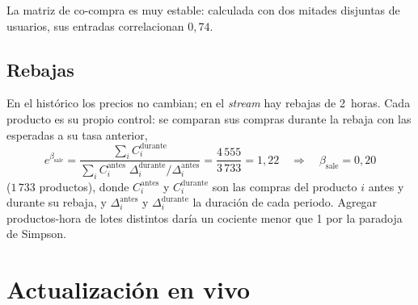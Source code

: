 \documentclass[11pt,a4paper]{article}
\begin{document}
La matriz de co-compra es muy estable: calculada con dos mitades disjuntas de usuarios, sus entradas
correlacionan $0{,}74$.

\subsection{Rebajas}

En el histórico los precios no cambian; en el \emph{stream} hay rebajas de 2~horas. Cada producto es su
propio control: se comparan sus compras durante la rebaja con las esperadas a su tasa anterior,
\[
e^{\beta_{\text{sale}}}=\frac{\sum_i C_i^{\text{durante}}}{\sum_i C_i^{\text{antes}}\;\Delta_i^{\text{durante}}/\Delta_i^{\text{antes}}}
=\frac{4\,555}{3\,733}=1{,}22\quad\Longrightarrow\quad\beta_{\text{sale}}=0{,}20
\]
($1\,733$ productos), donde $C_i^{\text{antes}}$ y $C_i^{\text{durante}}$ son las compras del producto $i$
antes y durante su rebaja, y $\Delta_i^{\text{antes}}$ y $\Delta_i^{\text{durante}}$ la duración de cada
periodo. Agregar productos-hora de lotes distintos daría un cociente menor que 1 por la
paradoja de Simpson.

\section{Actualización en vivo}
\end{document}
